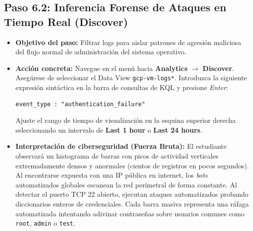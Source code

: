 \documentclass[
  coursetitle={Cómputo Nube y Tecnologías Emergentes},
  coursehours={96},
  coursedate={Verano 2026},
  doctype={Práctica},
  otherlangs={english,french},
  authorname={Lázaro},
  authorsurname={Bustio-Martínez},
  authortitle={PhD},
  role={Profesor Investigador},
  email={lbustio@inaoe.mx},
  phone={5559504000},
  ext={7459},
  institution={Instituto Nacional de Astrofísica, Óptica y Electrónica (INAOE)},
  department={Maestría en Ciencias en Tecnologías de Seguridad},
  address={Luis Enrique Erro 1, Sta. Ma. Tonantzintla, San Andrés Cholula, CP 72840, Puebla, México},
  margin={0.5in}
]{../../lbustio_lecture_notes}
\begin{document}
\subsection{Paso 6.2: Inferencia Forense de Ataques en Tiempo Real (Discover)}
\begin{itemize}
    \item \textbf{Objetivo del paso:} Filtrar logs para aislar patrones de agresión maliciosa del flujo normal de administración del sistema operativo.
    \item \textbf{Acción concreta:} Navegue en el menú hacia \textbf{Analytics} $\rightarrow$ \textbf{Discover}. Asegúrese de seleccionar el Data View \texttt{gcp-vm-logs*}. Introduzca la siguiente expresión sintáctica en la barra de consultas de KQL y presione \textit{Enter}:
\begin{verbatim}
event_type : "authentication_failure"
\end{verbatim}
    Ajuste el rango de tiempo de visualización en la esquina superior derecha seleccionando un intervalo de \textbf{Last 1 hour} o \textbf{Last 24 hours}.
      
    \item \textbf{Interpretación de ciberseguridad (Fuerza Bruta):} El estudiante observará un histograma de barras con picos de actividad verticales extremadamente densos y anormales (cientos de registros en pocos segundos). Al encontrarse expuesta con una IP pública en internet, los \textit{bots} automatizados globales escanean la red perimetral de forma constante. Al detectar el puerto TCP 22 abierto, ejecutan ataques automatizados probando diccionarios enteros de credenciales. Cada barra masiva representa una ráfaga automatizada intentando adivinar contraseñas sobre usuarios comunes como \texttt{root}, \texttt{admin} o \texttt{test}.
\end{itemize}
\end{document}
